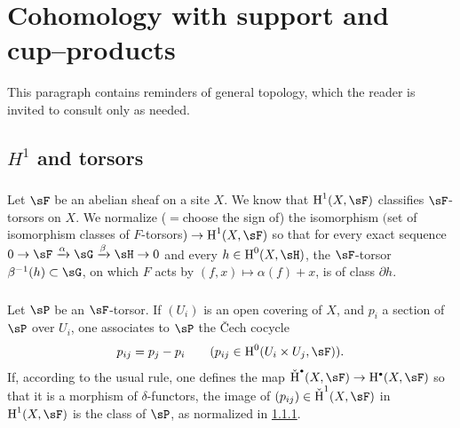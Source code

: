 \section{Cohomology with support and cup--products}\label{IV:1}

This paragraph contains reminders of general topology, which the
reader is invited to consult only as needed.










\subsection{\texorpdfstring{$H^1$}{H1} and torsors}\label{IV:1-1}




\subsubsection{}\label{IV:1-1-1}

Let $\sF$ be an abelian sheaf on a site $X$. We know that $\h^1(X,\sF)$
classifies $\sF$-torsors on $X$. We normalize ($=$choose the
sign of) the isomorphism $($set of isomorphism classes of
$F$-torsors$)\to \h^1(X,\sF)$ so that for every exact sequence
$0\to \sF\xrightarrow\alpha\sG\xrightarrow\beta\sH\to 0$ and every
$h\in\h^0(X,\sH)$, the $\sF$-torsor $\beta^{-1}(h)\subset \sG$, on which
$F$ acts by $(f,x)\mapsto \alpha(f)+x$, is of class $\partial h$.




\subsubsection{}\label{IV:1-1-2}

Let $\sP$ be an $\sF$-torsor. If $(U_i)$ is an open covering of $X$, and
$p_i$ a section of $\sP$ over $U_i$, one associates to $\sP$ the
\v{C}ech cocycle
\[
  p_{i j} = p_j - p_i \qquad \text{($p_{i j}\in \h^0(U_i\times U_j,\sF)$).}
\]
If, according to the usual rule, one defines the map
$\operatorname{\check H}^\bullet(X,\sF)\to \h^\bullet(X,\sF)$ so that
it is a morphism of $\delta$-functors, the image of
$(p_{i j})\in \operatorname{\check H}^1(X,\sF)$ in $\h^1(X,\sF)$ is the
class of $\sP$, as normalized in \ref{IV:1-1-1}.




\subsubsection{}\label{IV:1-1-3}

